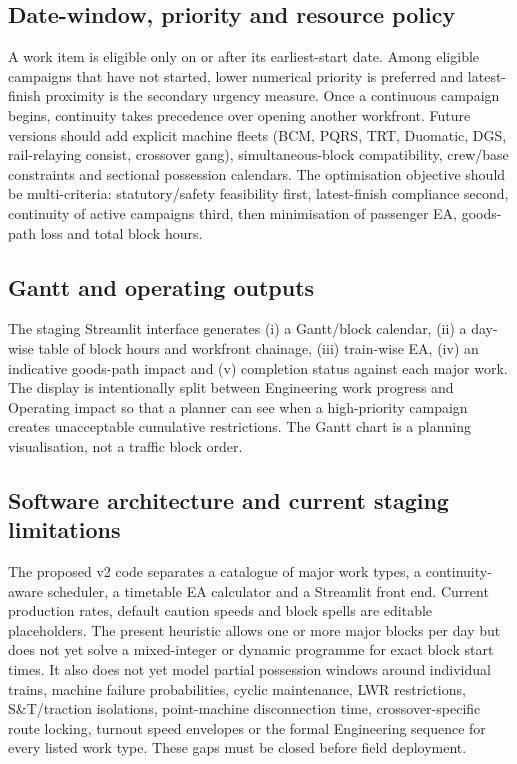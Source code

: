 \documentclass[10pt,a4paper]{article}
\begin{document}
\subsection{Date-window, priority and resource policy}
A work item is eligible only on or after its earliest-start date. Among eligible campaigns that have not started, lower numerical priority is preferred and latest-finish proximity is the secondary urgency measure. Once a continuous campaign begins, continuity takes precedence over opening another workfront. Future versions should add explicit machine fleets (BCM, PQRS, TRT, Duomatic, DGS, rail-relaying consist, crossover gang), simultaneous-block compatibility, crew/base constraints and sectional possession calendars. The optimisation objective should be multi-criteria: statutory/safety feasibility first, latest-finish compliance second, continuity of active campaigns third, then minimisation of passenger EA, goods-path loss and total block hours.

\subsection{Gantt and operating outputs}
The staging Streamlit interface generates (i) a Gantt/block calendar, (ii) a day-wise table of block hours and workfront chainage, (iii) train-wise EA, (iv) an indicative goods-path impact and (v) completion status against each major work. The display is intentionally split between Engineering work progress and Operating impact so that a planner can see when a high-priority campaign creates unacceptable cumulative restrictions. The Gantt chart is a planning visualisation, not a traffic block order.

\subsection{Software architecture and current staging limitations}
The proposed v2 code separates a catalogue of major work types, a continuity-aware scheduler, a timetable EA calculator and a Streamlit front end. Current production rates, default caution speeds and block spells are editable placeholders. The present heuristic allows one or more major blocks per day but does not yet solve a mixed-integer or dynamic programme for exact block start times. It also does not yet model partial possession windows around individual trains, machine failure probabilities, cyclic maintenance, LWR restrictions, S\&T/traction isolations, point-machine disconnection time, crossover-specific route locking, turnout speed envelopes or the formal Engineering sequence for every listed work type. These gaps must be closed before field deployment.
\end{document}
